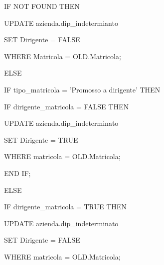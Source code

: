 \begin{flushleft}
\begin{description}
\begin{description}
\begin{description}
                            \vspace{0.5cm}

                            \item IF NOT FOUND THEN
                            \begin{description}
                                \item UPDATE azienda.dip\_indetermianto
                                \item SET Dirigente = FALSE
                                \item WHERE Matricola = OLD.Matricola;
                            \end{description}

                            \item ELSE
                            \begin {description}
                                \item IF tipo\_matricola = 'Promosso a dirigente' THEN
                                \begin {description}
                                    \item IF dirigente\_matricola = FALSE THEN
                                    \begin{description}
                                        \item UPDATE azienda.dip\_indeterminato
                                        \item SET Dirigente = TRUE
                                        \item WHERE matricola = OLD.Matricola;
                                    \end{description}
                                    \item END IF;
                                \end{description}
                                \item ELSE
                                \begin{description}
                                    \item IF dirigente\_matricola = TRUE THEN
                                    \begin{description}
                                        \item UPDATE azienda.dip\_indeterminato
                                        \item SET Dirigente = FALSE
                                        \item WHERE matricola = OLD.Matricola;

\end{description}
\end{description}
\end{description}
\end{description}
\end{description}
\end{description}
\end{flushleft}
